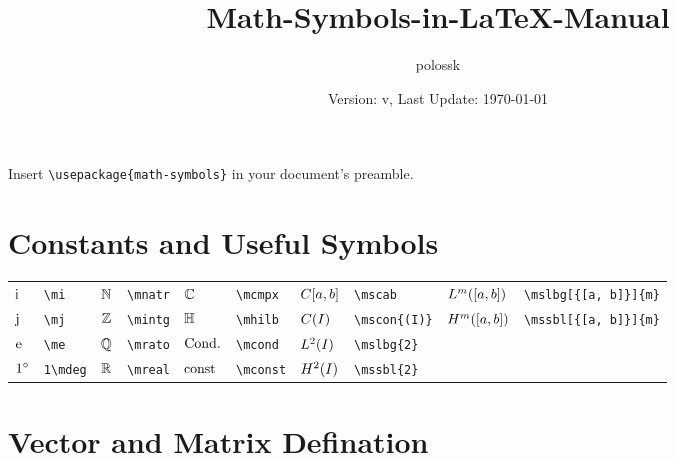\documentclass{article}
\title{Math-Symbols-in-\LaTeX{}-Manual}
\author{polossk}
\date{Version: v\artversion, Last Update: \today}
\begin{document}
\maketitle

Insert \lstinline`\usepackage{math-symbols}` in your document's preamble.

\tableofcontents
\thispagestyle{fancy}
\renewcommand{\baselinestretch}{1.25}
\section{Constants and Useful Symbols}
\begin{tabular}{*{10}{l}}
$\mi$ & \lstinline`\mi` & $\mnatr$ & \lstinline`\mnatr` & $\mcmpx$ & \lstinline`\mcmpx` & $\mscab$ & \lstinline`\mscab` & $\mslbg[{[a, b]}]{m}$ & \lstinline`\mslbg[{[a, b]}]{m}`\\
$\mj$ & \lstinline`\mj` & $\mintg$ & \lstinline`\mintg` & $\mhilb$ & \lstinline`\mhilb` & $\mscon{(I)}$ & \lstinline`\mscon{(I)}` & $\mssbl[{[a, b]}]{m}$ & \lstinline`\mssbl[{[a, b]}]{m}`\\
$\me$ & \lstinline`\me` & $\mrato$ & \lstinline`\mrato` & $\mcond$ & \lstinline`\mcond` & $\mslbg{2}$ & \lstinline`\mslbg{2}` & \\
$1\mdeg$ & \lstinline`1\mdeg` & $\mreal$ & \lstinline`\mreal` & $\mconst$ & \lstinline`\mconst` & $\mssbl{2}$ & \lstinline`\mssbl{2}` & \\
\end{tabular}

\section{Vector and Matrix Defination}
\end{document}

